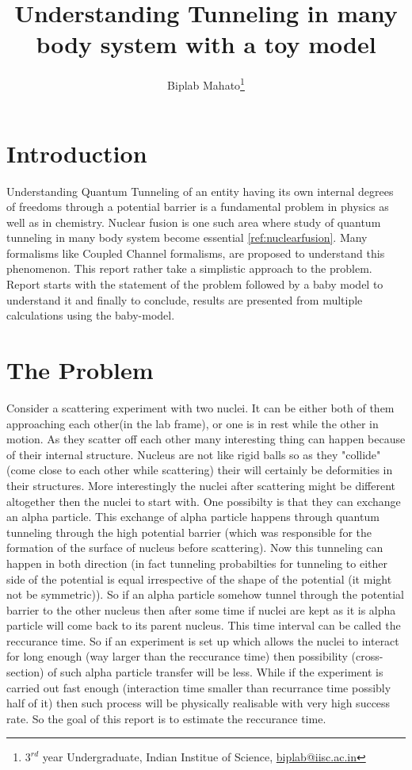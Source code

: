 \documentclass[a4paper,two column]{article}
\title{Understanding Tunneling in many body system with a toy model}
\author{Biplab Mahato\thanks{$3^{rd}$ year Undergraduate, Indian Institue of Science, \href{mailto:biplab@iisc.ac.in}{biplab@iisc.ac.in}}}
\begin{document}
    \maketitle
        \tableofcontents
        \section{Introduction}\label{sec:Introduction}
            Understanding Quantum Tunneling of an entity having its own internal degrees of freedoms through a potential barrier is a fundamental problem in physics as well as in chemistry. Nuclear fusion is one such area where study of quantum tunneling in many body system become essential \ref{ref:nuclearfusion}. Many formalisms like Coupled Channel formalisms, are proposed to understand this phenomenon. This report rather take a simplistic approach to the problem. Report starts with the statement of the problem followed by a baby model to understand it and finally to conclude, results are presented from multiple calculations using the baby-model.
        \section{The Problem}\label{sec:problem}
            Consider a scattering experiment with two nuclei. It can be either both of them approaching each other(in the lab frame), or one is in rest while the other in motion. As they scatter off each other many interesting thing can happen because of their internal structure. Nucleus are not like rigid balls so as they "collide" (come close to each other while scattering) their will certainly be deformities in their structures. More interestingly the nuclei after scattering might be different altogether then the nuclei to start with. One possibilty is that they  can exchange an alpha particle. This exchange of alpha particle happens through quantum tunneling through the high potential barrier (which was responsible for the formation of the surface of nucleus before scattering). Now this tunneling can happen in both direction (in fact tunneling probabilties for tunneling to either side of the potential is equal irrespective of the shape of the potential (it might not be symmetric)). So if an alpha particle somehow tunnel through the potential barrier to the other nucleus then after some time if nuclei are kept as it is alpha particle will come back to its parent nucleus. This time interval can be called the reccurance time. So if an experiment is set up which allows the nuclei to interact for long enough (way larger than the reccurance time) then possibility (cross-section) of such alpha particle transfer will be less. While if the experiment is carried out fast enough (interaction time smaller than recurrance time possibly half of it) then such process will be physically realisable with very high success rate. So the goal of this report is to estimate the reccurance time.  
\end{document}
